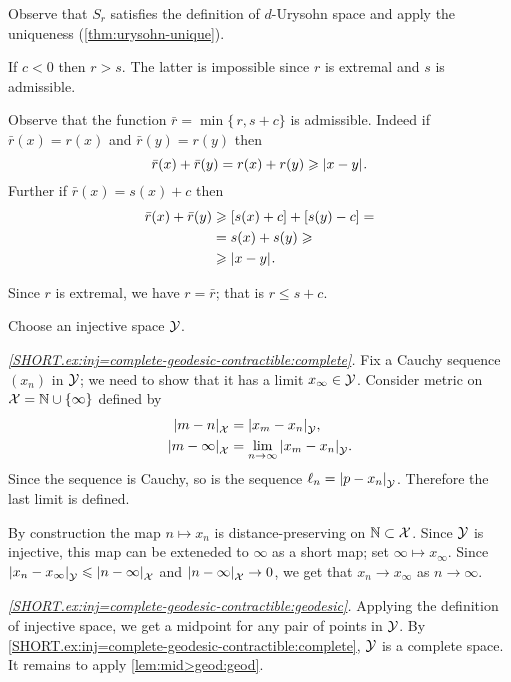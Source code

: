 Observe that $S_r$ satisfies the definition of $d$-Urysohn space and apply the uniqueness (\ref{thm:urysohn-unique}).


If $c<0$ then $r>s$.
The latter is impossible since $r$ is extremal and $s$ is admissible.

Observe that the function $\bar r=\min\{\,r,s+c\}$ is admissible.
Indeed if $\bar r(x)=r(x)$ and $\bar r(y)=r(y)$ then 
\[\bar r(x)+\bar r(y)=r(x)+ r(y)\ge \dist{x}{y}{}.\]
Further if $\bar r(x)=s(x)+c$ then 
\begin{align*}
\bar r(x)+\bar r(y)&\ge [s(x)+c]+ [s(y)-c]= 
\\
&=s(x)+s(y) \ge 
\\
&\ge\dist{x}{y}{}.
\end{align*}

Since $r$ is extremal, we have $r=\bar r$;
that is $r\le s+c$.

Choose an injective space $\mathcal{Y}$.

\textit{\ref{SHORT.ex:inj=complete-geodesic-contractible:complete}.}
Fix a Cauchy sequence $(x_n)$ in $\mathcal{Y}$;
we need to show that it has a limit $x_\infty\in \mathcal{Y}$.
Consider metric on $\mathcal{X}=\mathbb{N}\cup\{\infty\}$ defined by 
\begin{align*}
\dist{m}{n}{\spc{X}}&=\dist{x_m}{x_n}{\spc{Y}},
\\
\dist{m}{\infty}{\spc{X}}&=\lim_{n\to\infty}\dist{x_m}{x_n}{\spc{Y}}.
\end{align*}
Since the sequence is Cauchy, so is the sequence $\ell_n=\dist{p}{x_n}{\spc{Y}}$.
Therefore the last limit is defined.

By construction the map $n\mapsto x_n$ is distance-preserving on $\mathbb{N}\subset \mathcal{X}$.
Since $\mathcal{Y}$ is injective, this map can be exteneded to $\infty$ as a short map; set $\infty\mapsto x_\infty$.
Since $\dist{x_n}{x_\infty}{\spc{Y}}\le \dist{n}{\infty}{\spc{X}}$ 
and $\dist{n}{\infty}{\spc{X}}\to 0$, we get that
$x_n\to x_\infty$ as $n\to\infty$.

\textit{\ref{SHORT.ex:inj=complete-geodesic-contractible:geodesic}.}
Applying the definition of injective space, we get a midpoint for any pair of points in $\mathcal{Y}$.
By \ref{SHORT.ex:inj=complete-geodesic-contractible:complete},
$\mathcal{Y}$ is a complete space.
It remains to apply \ref{lem:mid>geod:geod}.

